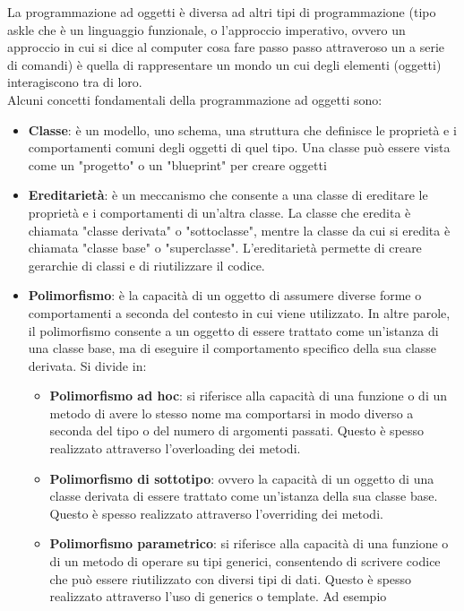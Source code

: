 \documentclass{report}
\begin{document}
\tableofcontents
\newpage



La programmazione ad oggetti è diversa ad altri tipi di programmazione (tipo askle che è un linguaggio funzionale, o l'approccio imperativo, ovvero  un approccio in cui si dice al computer cosa fare passo passo attraveroso un a serie di comandi) è quella di rappresentare un mondo un cui degli elementi (oggetti) interagiscono tra di loro. \\

Alcuni concetti fondamentali della programmazione ad oggetti sono:
\begin{itemize}
    \item \textbf{Classe}: è un modello, uno schema, una struttura che definisce le proprietà e i comportamenti comuni degli oggetti di quel tipo. Una classe può essere vista come un "progetto" o un "blueprint" per creare oggetti
    \item \textbf{Ereditarietà}: è un meccanismo che consente a una classe di ereditare le proprietà e i comportamenti di un'altra classe. La classe che eredita è chiamata "classe derivata" o "sottoclasse", mentre la classe da cui si eredita è chiamata "classe base" o "superclasse". L'ereditarietà permette di creare gerarchie di classi e di riutilizzare il codice.
    \item \textbf{Polimorfismo}: è la capacità di un oggetto di assumere diverse forme o comportamenti a seconda del contesto in cui viene utilizzato. In altre parole, il polimorfismo consente a un oggetto di essere trattato come un'istanza di una classe base, ma di eseguire il comportamento specifico della sua classe derivata. Si divide in:
    \begin{itemize}
        \item \textbf{Polimorfismo ad hoc}: si riferisce alla capacità di una funzione o di un metodo di avere lo stesso nome ma comportarsi in modo diverso a seconda del tipo o del numero di argomenti passati. Questo è spesso realizzato attraverso l'overloading dei metodi.
        \item \textbf{Polimorfismo di sottotipo}: ovvero la capacità di un oggetto di una classe derivata di essere trattato come un'istanza della sua classe base. Questo è spesso realizzato attraverso l'overriding dei metodi.
        \item \textbf{Polimorfismo parametrico}: si riferisce alla capacità di una funzione o di un metodo di operare su tipi generici, consentendo di scrivere codice che può essere riutilizzato con diversi tipi di dati. Questo è spesso realizzato attraverso l'uso di generics o template. Ad esempio
    \end{itemize}
\end{itemize}
\end{document}
